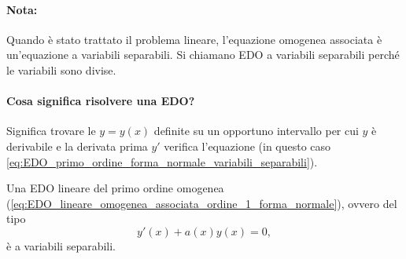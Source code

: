 \paragraph{Nota:} Quando è stato trattato il problema lineare, l'equazione omogenea associata è un'equazione a variabili separabili. Si chiamano EDO a variabili separabili perché le variabili sono divise.

\paragraph{Cosa significa risolvere una EDO?} Significa trovare le $y=y(x)$ definite su un opportuno intervallo per cui $y$ è derivabile e la derivata prima $y'$ verifica l'equazione (in questo caso \ref{eq:EDO_primo_ordine_forma_normale_variabili_separabili}). 

\begin{remark}
    Una EDO lineare del primo ordine omogenea (\ref{eq:EDO_lineare_omogenea_associata_ordine_1_forma_normale}), ovvero del tipo
    \begin{equation*}
        y'(x) + a(x) y(x) = 0,
    \end{equation*}
    è a variabili separabili.
\end{remark}

